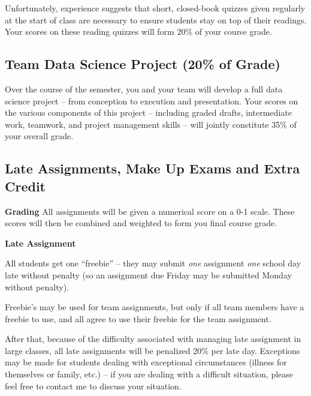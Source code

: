 \documentclass[12pt]{article}
\begin{document}
Unfortunately, experience suggests that short, closed-book quizzes given regularly at the start of class are necessary to ensure students stay on top of their readings. Your scores on these reading quizzes will form 20\% of your course grade.

\subsection{Team Data Science Project (20\% of Grade)}

Over the course of the semester, you and your team will develop a full data science project -- from conception to execution and presentation. Your scores on the various components of this project -- including graded drafts, intermediate work, teamwork, and project management skills -- will jointly constitute 35\% of your overall grade.

\subsection{Late Assignments, Make Up Exams and Extra Credit}


\textbf{Grading}
All assignments will be given a numerical score on a 0-1 scale.  These scores will then be combined and weighted to form you final course grade.

\textbf{Late Assignment}

All students get one ``freebie'' -- they may submit \emph{one} assignment \emph{one} school day late without penalty (so an assignment due Friday may be submitted Monday without penalty).

Freebie's may be used for team assignments, but only if all team members have a freebie to use, and all agree to use their freebie for the team assignment.

After that, because of the difficulty associated with managing late assignment in large classes, all late assignments will be penalized 20\% per late day. Exceptions may be made for students dealing with exceptional circumstances (illness for themselves or family, etc.) -- if you are dealing with a difficult situation, please feel free to contact me to discuss your situation.
\end{document}
